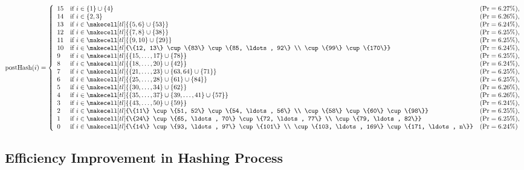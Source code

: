 \renewcommand{\arraystretch}{1.25}{
\[
\text{postHash}(i) = \left\{
\begin{array}{lll}
    15 & \text{if } i \in \{1\} \cup \{4\} & (\text{Pr} = 6.27\%), \\
    14 & \text{if } i \in \{2, 3\} & (\text{Pr} = 6.26\%), \\
    13 & \text{if } i \in \makecell[tl]{\{5, 6\} \cup \{53\}} & (\text{Pr} = 6.24\%), \\
    12 & \text{if } i \in \makecell[tl]{\{7, 8\} \cup \{38\}} & (\text{Pr} = 6.25\%), \\
    11 & \text{if } i \in \makecell[tl]{\{9, 10\} \cup \{29\}} & (\text{Pr} = 6.25\%), \\
    10 & \text{if } i \in \makecell[tl]{\{12, 13\} \cup \{83\} \cup \{85, \ldots, 92\} \\ \cup \{99\} \cup \{170\}} & (\text{Pr} = 6.24\%), \\
    9  & \text{if } i \in \makecell[tl]{\{15, \ldots, 17\} \cup \{78\}} & (\text{Pr} = 6.25\%), \\
    8  & \text{if } i \in \makecell[tl]{\{18, \ldots, 20\} \cup \{42\}} & (\text{Pr} = 6.24\%), \\
    7  & \text{if } i \in \makecell[tl]{\{21, \ldots, 23\} \cup \{63, 64\} \cup \{71\}} & (\text{Pr} = 6.25\%), \\
    6  & \text{if } i \in \makecell[tl]{\{25, \ldots, 28\} \cup \{61\} \cup \{84\}} & (\text{Pr} = 6.25\%), \\
    5  & \text{if } i \in \makecell[tl]{\{30, \ldots, 34\} \cup \{62\}} & (\text{Pr} = 6.26\%), \\
    4  & \text{if } i \in \makecell[tl]{\{35, \ldots, 37\} \cup \{39, \ldots, 41\} \cup \{57\}} & (\text{Pr} = 6.26\%), \\
    3  & \text{if } i \in \makecell[tl]{\{43, \ldots, 50\} \cup \{59\}} & (\text{Pr} = 6.24\%), \\
    2  & \text{if } i \in \makecell[tl]{\{11\} \cup \{51, 52\} \cup \{54, \ldots, 56\} \\ \cup \{58\} \cup \{60\} \cup \{98\}} & (\text{Pr} = 6.25\%), \\
    1  & \text{if } i \in \makecell[tl]{\{24\} \cup \{65, \ldots, 70\} \cup \{72, \ldots, 77\} \\ \cup \{79, \ldots, 82\}} & (\text{Pr} = 6.25\%), \\
    0  & \text{if } i \in \makecell[tl]{\{14\} \cup \{93, \ldots, 97\} \cup \{101\} \\ \cup \{103, \ldots, 169\} \cup \{171, \ldots, n\}} & (\text{Pr} = 6.24\%)
\end{array}
\right.
\]
}




\subsection{Efficiency Improvement in Hashing Process}